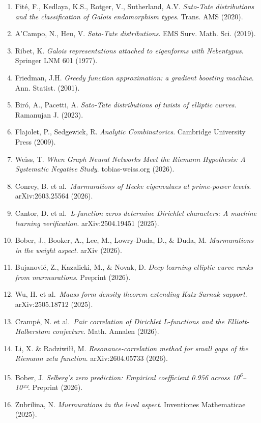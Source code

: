 \documentclass[
]{article}
\begin{document}
\begin{enumerate}
  Modular Forms'', Springer (2014).
\item
  Fité, F., Kedlaya, K.S., Rotger, V., Sutherland, A.V. \emph{Sato-Tate
  distributions and the classification of Galois endomorphism types}.
  Trans. AMS (2020).
\item
  A'Campo, N., Heu, V. \emph{Sato-Tate distributions}. EMS Surv. Math.
  Sci. (2019).
\item
  Ribet, K. \emph{Galois representations attached to eigenforms with
  Nebentypus}. Springer LNM 601 (1977).
\item
  Friedman, J.H. \emph{Greedy function approximation: a gradient
  boosting machine}. Ann. Statist. (2001).
\item
  Biró, A., Pacetti, A. \emph{Sato-Tate distributions of twists of
  elliptic curves}. Ramanujan J. (2023).
\item
  Flajolet, P., Sedgewick, R. \emph{Analytic Combinatorics}. Cambridge
  University Press (2009).
\item
  Weiss, T. \emph{When Graph Neural Networks Meet the Riemann
  Hypothesis: A Systematic Negative Study}. tobias-weiss.org (2026).
\item
  Conrey, B. et al.~\emph{Murmurations of Hecke eigenvalues at
  prime-power levels}. arXiv:2603.25564 (2026).
\item
  Cantor, D. et al.~\emph{L-function zeros determine Dirichlet
  characters: A machine learning verification}. arXiv:2504.19451 (2025).
\item
  Bober, J., Booker, A., Lee, M., Lowry-Duda, D., \& Duda, M.
  \emph{Murmurations in the weight aspect}. arXiv (2026).
\item
  Bujanović, Z., Kazalicki, M., \& Novak, D. \emph{Deep learning
  elliptic curve ranks from murmurations}. Preprint (2026).
\item
  Wu, H. et al.~\emph{Maass form density theorem extending Katz-Sarnak
  support}. arXiv:2505.18712 (2025).
\item
  Crampé, N. et al.~\emph{Pair correlation of Dirichlet L-functions and
  the Elliott-Halberstam conjecture}. Math. Annalen (2026).
\item
  Li, X. \& Radziwiłł, M. \emph{Resonance-correlation method for small
  gaps of the Riemann zeta function}. arXiv:2604.05733 (2026).
\item
  Bober, J. \emph{Selberg's zero prediction: Empirical coefficient 0.956
  across 10\textsuperscript{6}--10²²}. Preprint (2026).
\item
  Zubrilina, N. \emph{Murmurations in the level aspect}. Inventiones
  Mathematicae (2025).
\end{enumerate}
\end{document}
